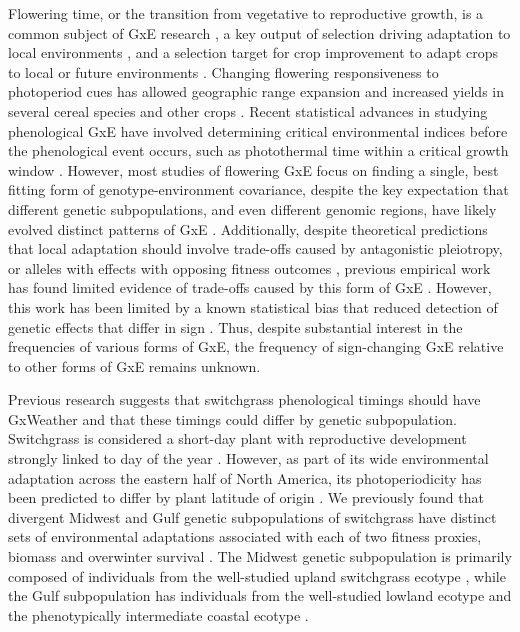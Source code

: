 \documentclass[
  9pt,
  twocolumn,
  twoside]{simple-article}%
\begin{document}
Flowering time, or the transition from vegetative to reproductive
growth, is a common subject of GxE research
\citep{blackman2013interacting, henry2014transitions, aagren2017adaptive, brachi2010linkage, dittmar2014flowering, li2018genomic, romero2017study, bustos-korts2019},
a key output of selection driving adaptation to local environments
\citep{unterseer2016, andres2012genetic, wadgymar2017identifying, blumel2015flowering, fournier-level2016},
and a selection target for crop improvement to adapt crops to local or
future environments \citet{jung2009flowering}. Changing flowering
responsiveness to photoperiod cues has allowed geographic range
expansion and increased yields in several cereal species
\citep{unterseer2016, turner2005pseudo, faure2012mutation, hung2012zmcct, zakhrabekova2012induced, yang2013oself3}
and other crops \citep{pin2012multifaceted, weller2019parallel}. Recent
statistical advances in studying phenological GxE have involved
determining critical environmental indices before the phenological event
occurs, such as photothermal time within a critical growth window
\citet{li2018genomic}. However, most studies of flowering GxE focus on
finding a single, best fitting form of genotype-environment covariance,
despite the key expectation that different genetic subpopulations, and
even different genomic regions, have likely evolved distinct patterns of
GxE \citep{Weine2023.06.21.545998}. Additionally, despite theoretical
predictions that local adaptation should involve trade-offs caused by
antagonistic pleiotropy, or alleles with effects with opposing fitness
outcomes
\citep{levene1953genetic, felsenstein1976theoretical, kawecki2004conceptual, hedrick1986genetic},
previous empirical work has found limited evidence of trade-offs caused
by this form of GxE
\citep{des2013genotype, wadgymar2017identifying, millet2016}. However,
this work has been limited by a known statistical bias that reduced
detection of genetic effects that differ in sign
\citep{des2013genotype, anderson2013genetic, anderson2011evolutionary}.
Thus, despite substantial interest in the frequencies of various forms
of GxE, the frequency of sign-changing GxE relative to other forms of
GxE remains unknown.

Previous research suggests that switchgrass phenological timings should
have GxWeather and that these timings could differ by genetic
subpopulation. Switchgrass is considered a short-day plant with
reproductive development strongly linked to day of the year
\citet{mitchell1997predicting}. However, as part of its wide
environmental adaptation across the eastern half of North America, its
photoperiodicity has been predicted to differ by plant latitude of
origin \citep{parrish2005biology, casler2004latitudinal}. We previously
found that divergent Midwest and Gulf genetic subpopulations of
switchgrass have distinct sets of environmental adaptations associated
with each of two fitness proxies, biomass and overwinter survival
\citet{lovell2021}. The Midwest genetic subpopulation is primarily
composed of individuals from the well-studied upland switchgrass ecotype
\citep{porter1966analysis, milano2016genetic}, while the Gulf
subpopulation has individuals from the well-studied lowland ecotype and
the phenotypically intermediate coastal ecotype \citet{lovell2021}.
\end{document}
